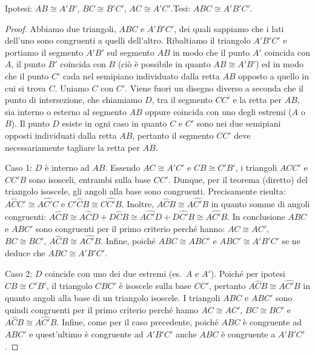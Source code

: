 \noindent Ipotesi: $AB\cong A'B'$, $BC\cong B'C'$, $AC\cong A'C'$.\tab Tesi: $ABC\cong A'B'C'$.

\begin{figure}[htb]
\centering
\end{figure}

\begin{proof}
Abbiamo due triangoli, $ABC$ e $A'B'C'$, dei quali sappiamo che i lati dell'uno sono congruenti a quelli dell'altro. Ribaltiamo il triangolo $A'B'C'$ e portiamo il segmento $A'B'$ sul segmento $AB$ in modo che il punto $A'$ coincida con $A$, il punto $B'$ coincida con $B$ (ciò è possibile in quanto $AB\cong A'B'$) ed in modo che il punto $C'$ cada nel semipiano individuato dalla retta $AB$ opposto a quello in cui si trova $C$. Uniamo $C$ con $C'$. Viene fuori un disegno diverso a seconda che il punto di intersezione, che chiamiamo $D$, tra il segmento $CC'$ e la retta per $AB$, sia interno o esterno al segmento $AB$ oppure coincida con uno degli estremi ($A$ o $B$). Il punto $D$ esiste in ogni caso in quanto $C$ e $C'$ sono nei due semipiani opposti individuati dalla retta $AB$, pertanto il segmento $CC'$ deve necessariamente tagliare la retta per $AB$.

Caso 1: $D$ è interno ad $AB$.
Essendo $AC\cong A'C'$ e $CB\cong C'B'$, i triangoli $ACC'$ e $CC'B$ sono isosceli, entrambi sulla base $CC'$. Dunque, per il teorema (diretto) del triangolo isoscele, gli angoli alla base sono congruenti. Precisamente risulta: $A\widehat{C}C'\cong A\widehat{C'}C$ e $C'\widehat{C}B\cong C\widehat{C'}B$. Inoltre, $A\widehat{C}B\cong A\widehat{C'}B$ in quanto somme di angoli congruenti:
$A\widehat{C}B\cong A\widehat{C}D+D\widehat{C}B\cong A\widehat{C'}D+D\widehat{C'}B\cong A\widehat{C'}B$.
In conclusione $ABC$ e $ABC'$ sono congruenti per il primo criterio perché hanno: $AC\cong AC'$, $BC\cong BC'$, $A\widehat{C}B\cong A\widehat{C'}B$. 
Infine, poiché $ABC\cong ABC'$ e $ABC'\cong A'B'C'$ se ne deduce che $ABC\cong A'B'C'$.

Caso 2: $D$ coincide con uno dei due estremi (es.~$A$ e $A'$). 
Poiché per ipotesi $CB\cong C'B'$, il triangolo $CBC'$ è isoscele sulla base $CC'$, pertanto $A\widehat{C}B\cong A\widehat{C'}B$ in quanto angoli alla base di un triangolo isoscele. I triangoli $ABC$ e $ABC'$ sono quindi congruenti per il primo criterio perché hanno $AC\cong AC'$, $BC\cong BC'$ e $A\widehat{C}B\cong A\widehat{C'}B$. Infine, come per il caso precedente, poiché $ABC$ è congruente ad $ABC'$ e quest'ultimo è congruente ad $A'B'C'$ anche $ABC$ è congruente a $A'B'C'$.


\end{proof}
